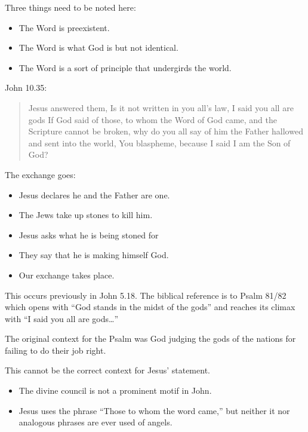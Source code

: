 \documentclass{beamer}
\begin{document}
\begin{frame}
  Three things need to be noted here:\pause
  \begin{itemize}
	\item The Word is preexistent.\pause
	\item The Word is what God is but not identical.\pause
	\item The Word is a sort of principle that undergirds the world.
  \end{itemize}
\end{frame}

\begin{frame}
  John 10.35:\\ \pause
  \begin{quote}
	Jesus answered them, Is it not written in you all's law, I said you all are gods
	If God said of those, to whom the Word of God came, and the Scripture cannot be broken,
	why do you all say of him the Father hallowed and sent into the world, You blaspheme, because I said I am the Son of God?
  \end{quote}
\end{frame}

\begin{frame}
  The exchange goes:\pause
  \begin{itemize}
	\item Jesus declares he and the Father are one.\pause
	\item The Jews take up stones to kill him.\pause
	\item Jesus asks what he is being stoned for\pause
	\item They say that he is making himself God.\pause
	\item Our exchange takes place.
  \end{itemize}
\end{frame}

\begin{frame}
  This occurs previously in John 5.18.
  The biblical reference is to Psalm 81/82 which opens with ``God stands in the midst of the gods'' and reaches its climax with ``I said you all are gods\ldots ''
\end{frame}

\begin{frame}
  The original context for the Psalm was God judging the gods of the nations for failing to do their job right.
\end{frame}

\begin{frame}
  This cannot be the correct context for Jesus' statement.\pause
  \begin{itemize}
	\item The divine council is not a prominent motif in John.\pause
	\item Jesus uses the phrase ``Those to whom the word came,'' but neither it nor analogous phrases are ever used of angels.
  \end{itemize}
\end{frame}
\end{document}
